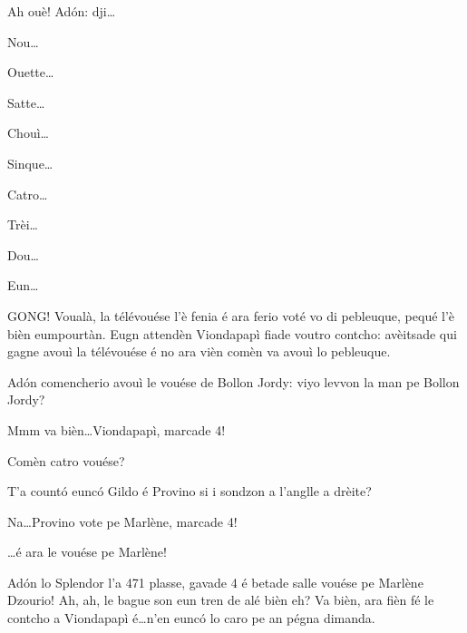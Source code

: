 \begin{drama}
\Brunospeaks Ah ouè! Ad\'on: dji\ldots

\Noteospeaks Nou\ldots

\Brunospeaks Ouette\ldots

\Noteospeaks Satte\ldots

\Brunospeaks Chouì\ldots

\Noteospeaks Sinque\ldots

\Brunospeaks Catro\ldots

\Noteospeaks Trèi\ldots

\Brunospeaks Dou\ldots

\Noteospeaks Eun\ldots


\Brunospeaks GONG! Voualà, la télévouése l'è fenia é ara ferio voté vo di pebleuque, pequé l'è bièn eumpourtàn. Eugn attendèn Viondapapì fiade voutro contcho: avèitsade qui gagne avouì la télévouése é no ara vièn comèn va avouì lo pebleuque.


\Brunospeaks {} Ad\'on comencherio avouì le vouése de Bollon Jordy: viyo levvon la man pe Bollon Jordy?


\Brunospeaks Mmm va bièn\ldots Viondapapì, marcade 4!

\Jordyspeaks Comèn catro vouése?

\Noteospeaks {} T'a count\'o eunc\'o Gildo é Provino si i sondzon a l'anglle a drèite?

\Brunospeaks Na\ldots Provino vote pe Marlène, marcade 4!

\Brunospeaks \ldots é ara le vouése pe Marlène!


\Brunospeaks  {} Ad\'on lo Splendor l'a 471 plasse, gavade 4 é betade salle vouése pe Marlène Dzourio!  Ah, ah, le bague son eun tren de alé bièn eh?  Va bièn, ara fièn fé le contcho a Viondapapì é\ldots n'en eunc\'o lo caro pe an pégna dimanda.



\end{drama}
